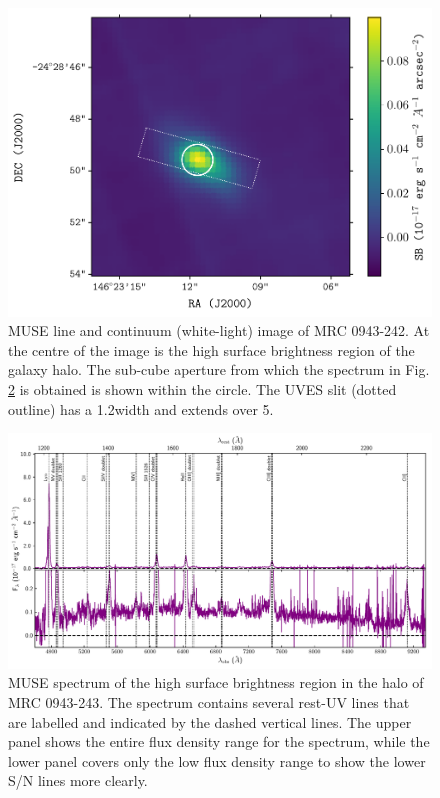 \begin{figure} 
\centering
\includegraphics[width=0.7\columnwidth]{plots_chp3/0943-242_continuum_img.pdf}
\caption[MUSE line and continuum (white-light) image of MRC 0943-242]{MUSE line and continuum (white-light) image of MRC 0943-242. At the centre of the image is the high surface brightness region of the galaxy halo. The sub-cube aperture from which the spectrum in Fig. \ref{fig:0943-spectrum} is obtained is shown within the circle. The UVES slit (dotted outline) has a 1.2\arcsec width and extends over 5\arcsec.}
\label{fig:0943-continuum}
\end{figure}

\begin{figure} 
\centering
\includegraphics[width=\textwidth]{plots_chp3/0943-242_spectrum_3_pix_zoom.pdf}
\caption[MUSE spectrum of the bright nucleus in MRC 0943-243]{MUSE spectrum of the high surface brightness region in the halo of MRC 0943-243. The spectrum contains several rest-UV lines that are labelled and indicated by the dashed vertical lines. The upper panel shows the entire flux density range for the spectrum, while the lower panel covers only the low flux density range to show the lower S/N lines more clearly.}
\label{fig:0943-spectrum}
\end{figure}


